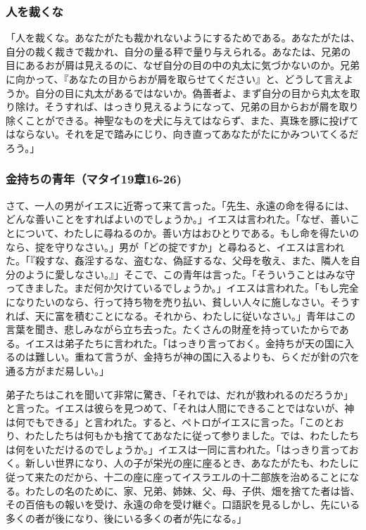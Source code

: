 \documentclass[uplatex,dvipdfmx]{jsarticle} \usepackage{mystyle}%
\begin{document}
\subsubsection*{人を裁くな}

「人を裁くな。あなたがたも裁かれないようにするためである。あなたがたは、自分の裁く裁きで裁かれ、自分の量る秤で量り与えられる。あなたは、兄弟の目にあるおが屑は見えるのに、なぜ自分の目の中の丸太に気づかないのか。兄弟に向かって、『あなたの目からおが屑を取らせてください』と、どうして言えようか。自分の目に丸太があるではないか。偽善者よ、まず自分の目から丸太を取り除け。そうすれば、はっきり見えるようになって、兄弟の目からおが屑を取り除くことができる。神聖なものを犬に与えてはならず、また、真珠を豚に投げてはならない。それを足で踏みにじり、向き直ってあなたがたにかみついてくるだろう。」


\subsubsection*{金持ちの青年（マタイ19章16-26)}

\label{sec:1916-26}

さて、一人の男がイエスに近寄って来て言った。「先生、永遠の命を得るには、どんな善いことをすればよいのでしょうか。」イエスは言われた。「なぜ、善いことについて、わたしに尋ねるのか。善い方はおひとりである。もし命を得たいのなら、掟を守りなさい。」男が「どの掟ですか」と尋ねると、イエスは言われた。「『殺すな、姦淫するな、盗むな、偽証するな、父母を敬え、また、隣人を自分のように愛しなさい。』」そこで、この青年は言った。「そういうことはみな守ってきました。まだ何か欠けているでしょうか。」イエスは言われた。「もし完全になりたいのなら、行って持ち物を売り払い、貧しい人々に施しなさい。そうすれば、天に富を積むことになる。それから、わたしに従いなさい。」青年はこの言葉を聞き、悲しみながら立ち去った。たくさんの財産を持っていたからである。イエスは弟子たちに言われた。「はっきり言っておく。金持ちが天の国に入るのは難しい。重ねて言うが、金持ちが神の国に入るよりも、らくだが針の穴を通る方がまだ易しい。」

弟子たちはこれを聞いて非常に驚き、「それでは、だれが救われるのだろうか」と言った。イエスは彼らを見つめて、「それは人間にできることではないが、神は何でもできる」と言われた。すると、ペトロがイエスに言った。「このとおり、わたしたちは何もかも捨ててあなたに従って参りました。では、わたしたちは何をいただけるのでしょうか。」イエスは一同に言われた。「はっきり言っておく。新しい世界になり、人の子が栄光の座に座るとき、あなたがたも、わたしに従って来たのだから、十二の座に座ってイスラエルの十二部族を治めることになる。わたしの名のために、家、兄弟、姉妹、父、母、子供、畑を捨てた者は皆、その百倍もの報いを受け、永遠の命を受け継ぐ。口語訳を見るしかし、先にいる多くの者が後になり、後にいる多くの者が先になる。」
\end{document}
